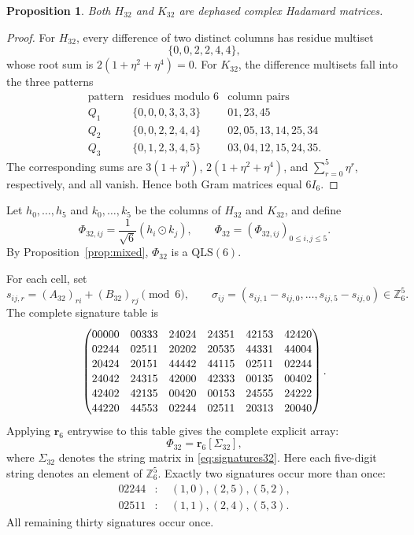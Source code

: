 \documentclass[11pt,a4paper]{article}
\newcommand{\Z}{\mathbb{Z}}
\newcommand{\QLS}{\mathrm{QLS}}
\newcommand{\od}{\mathbin{\odot}}
\newtheorem{proposition}{Proposition}
\begin{document}
\begin{proposition}\label{prop:H32K32had}
Both $H_{32}$ and $K_{32}$ are dephased complex Hadamard matrices.
\end{proposition}

\begin{proof}
For $H_{32}$, every difference of two distinct columns has residue multiset
\[
 \{0,0,2,2,4,4\},
\]
whose root sum is $2(1+\eta^2+\eta^4)=0$.  For $K_{32}$, the difference
multisets fall into the three patterns
\[
\begin{array}{c|c|c}
\text{pattern}&\text{residues modulo }6&\text{column pairs}\\
\hline
Q_1&\{0,0,0,3,3,3\}&01,23,45\\
Q_2&\{0,0,2,2,4,4\}&02,05,13,14,25,34\\
Q_3&\{0,1,2,3,4,5\}&03,04,12,15,24,35.
\end{array}
\]
The corresponding sums are
$3(1+\eta^3)$, $2(1+\eta^2+\eta^4)$, and
$\sum_{r=0}^{5}\eta^r$, respectively, and all vanish.  Hence both Gram
matrices equal $6I_6$.
\end{proof}

Let $h_0,\ldots,h_5$ and $k_0,\ldots,k_5$ be the columns of $H_{32}$ and
$K_{32}$, and define
\[
 \Phi_{32,ij}=\frac1{\sqrt6}(h_i\od k_j),
 \qquad
 \Phi_{32}=(\Phi_{32,ij})_{0\leq i,j\leq5}.
\]
By Proposition~\ref{prop:mixed}, $\Phi_{32}$ is a $\QLS(6)$.

For each cell, set
\[
 s_{ij,r}=(A_{32})_{ri}+(B_{32})_{rj}\pmod6,
 \qquad
 \sigma_{ij}=(s_{ij,1}-s_{ij,0},\ldots,s_{ij,5}-s_{ij,0})\in\Z_6^5.
\]
The complete signature table is
\begin{equation}\label{eq:signatures32}
\renewcommand{\arraystretch}{1.12}
 \begin{pmatrix}
 00000&00333&24024&24351&42153&42420\\
 02244&02511&20202&20535&44331&44004\\
 20424&20151&44442&44115&02511&02244\\
 24042&24315&42000&42333&00135&00402\\
 42402&42135&00420&00153&24555&24222\\
 44220&44553&02244&02511&20313&20040
 \end{pmatrix}.
\end{equation}
Applying $\mathbf r_6$ entrywise to this table gives the complete explicit
array:
\begin{equation}\label{eq:explicit32}
 \Phi_{32}=\mathbf r_6\!\left[\Sigma_{32}\right],
\end{equation}
where $\Sigma_{32}$ denotes the string matrix in
\eqref{eq:signatures32}.  Here each five-digit string denotes an element of
$\Z_6^5$.  Exactly two
signatures occur more than once:
\begin{align*}
 02244&:\quad (1,0),(2,5),(5,2),\\
 02511&:\quad (1,1),(2,4),(5,3).
\end{align*}
All remaining thirty signatures occur once.
\end{document}
